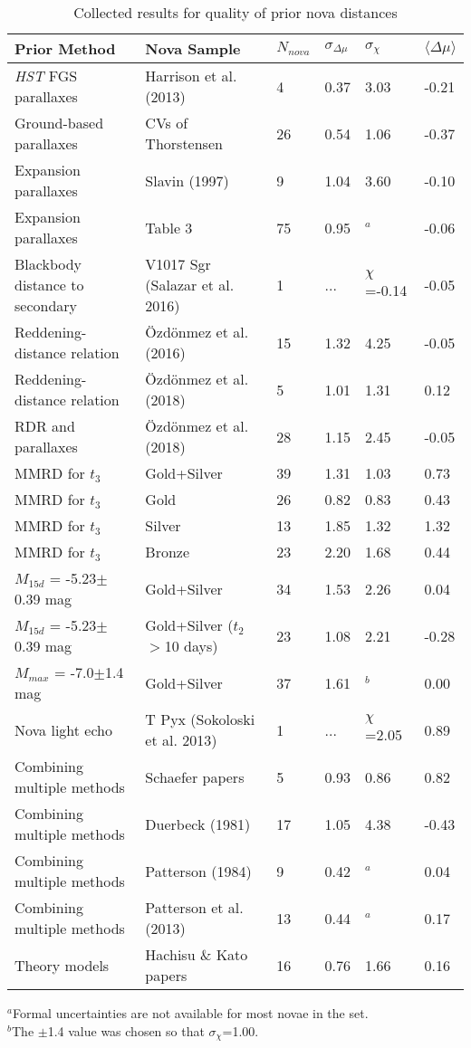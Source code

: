 \documentclass[a4paper,fleqn,usenatbib]{mnras}
\begin{document}
\begin{table}
	\centering
	\caption{Collected results for quality of prior nova distances}
	\begin{tabular}{llllll} 
		\hline
		Prior Method & Nova Sample & $N_{nova}$  &   $\sigma_{\Delta \mu}$      &      $\sigma_{\chi}$      &        $\langle \Delta \mu \rangle$      \\
		\hline
{\it HST} FGS parallaxes	&	Harrison et al. (2013)	&	4	&	0.37	&	3.03	&	-0.21	\\
Ground-based parallaxes	&	CVs of Thorstensen	&	26	&	0.54	&	1.06	&	-0.37	\\
Expansion parallaxes	&	Slavin (1997)	&	9	&	1.04	&	3.60	&	-0.10	\\
Expansion parallaxes	&	Table 3	&	75	&	0.95	&	$^a$	&	-0.06	\\
Blackbody distance to secondary	&	V1017 Sgr (Salazar et al. 2016)	&	1	&	...	&	$\chi$=-0.14	&	-0.05	\\
Reddening-distance relation	&	\"{O}zd\"{o}nmez et al. (2016)	&	15	&	1.32	&	4.25	&	-0.05	\\
Reddening-distance relation	&	\"{O}zd\"{o}nmez et al. (2018)	&	5	&	1.01	&	1.31	&	0.12	\\
RDR and parallaxes	&	\"{O}zd\"{o}nmez et al. (2018)	&	28	&	1.15	&	2.45	&	-0.05	\\
MMRD for $t_3$	&	Gold+Silver	&	39	&	1.31	&	1.03	&	0.73	\\
MMRD for $t_3$	&	Gold	&	26	&	0.82	&	0.83	&	0.43	\\
MMRD for $t_3$	&	Silver	&	13	&	1.85	&	1.32	&	1.32	\\
MMRD for $t_3$	&	Bronze	&	23	&	2.20	&	1.68	&	0.44	\\
$M_{15d}$ = -5.23$\pm$0.39 mag	&	Gold+Silver	&	34	&	1.53	&	2.26	&	0.04	\\
$M_{15d}$ = -5.23$\pm$0.39 mag	&	Gold+Silver ($t_2$$>$10 days)	&	23	&	1.08	&	2.21	&	-0.28	\\
$M_{max}$ = -7.0$\pm$1.4 mag	&	Gold+Silver	&	37	&	1.61	&	$^b$	&	0.00	\\
Nova light echo	&	T Pyx (Sokoloski et al. 2013)	&	1	&	...	&	$\chi$=2.05	&	0.89	\\
Combining multiple methods	&	Schaefer papers	&	5	&	0.93	&	0.86	&	0.82	\\
Combining multiple methods	&	Duerbeck (1981)	&	17	&	1.05	&	4.38	&	-0.43	\\
Combining multiple methods	&	Patterson (1984)	&	9	&	0.42	&	$^a$	&	0.04	\\
Combining multiple methods	&	Patterson et al. (2013)	&	13	&	0.44	&	$^a$	&	0.17	\\
Theory models	&	Hachisu \& Kato papers	&	16	&	0.76	&	1.66	&	0.16	\\
		\hline
	\end{tabular}
$^a$Formal uncertainties are not available for most novae in the set. \\
$^b$The $\pm$1.4 value was chosen so that $\sigma_{\chi}$=1.00.\\
\end{table}


\bsp	%
\label{lastpage}
\end{document}
